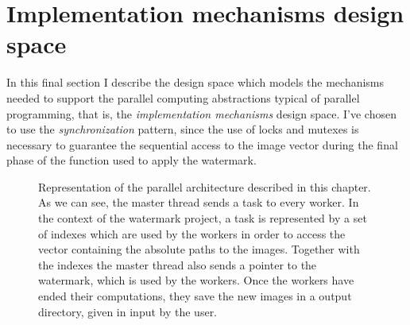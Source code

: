     \section{Implementation mechanisms design space} %
    \label{sec:implementation_mechanisms_design_space}
        In this final section I describe the design space which models the mechanisms needed to support the
        parallel computing abstractions typical of parallel programming, that is, the \textit{implementation
        mechanisms} design space. I've chosen to use the \textit{synchronization} pattern, since the use of
        locks and mutexes is necessary to guarantee the sequential access to the image vector during the final
        phase of the function used to apply the watermark.

        \begin{figure}[t]
        \centering
        \caption{Representation of the parallel architecture described in this chapter. As we can see, the
        master thread sends a task to every worker. In the context of the watermark project, a task is
        represented by a set of indexes which are used by the workers in order to access the vector
        containing the absolute paths to the images. Together with the indexes the master thread also sends
        a pointer to the watermark, which is used by the workers. Once the workers have ended their
        computations, they save the new images in a output directory, given in input by the user.}
        \label{fig:parallel_architecture}
        \end{figure}


